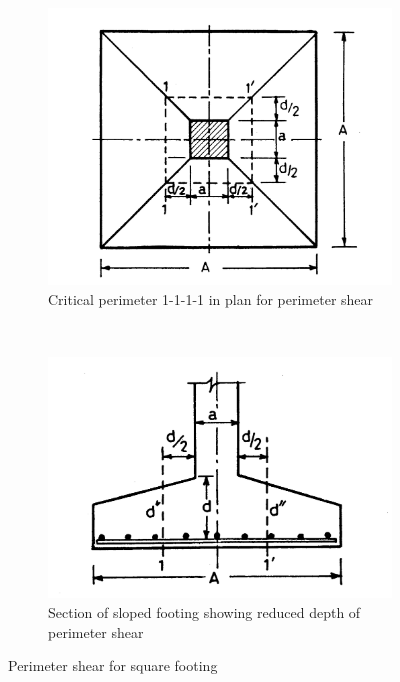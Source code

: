 \begin{figure}
  \centering
  \begin{subfigure}[b]{0.5\textwidth}
    \includegraphics[width=\textwidth]{images/fig2301.png}
    \caption{Critical perimeter 1-1-1-1 in plan for perimeter shear}
    \label{critical perimeter 1-1-1-1}
  \end{subfigure}\\
  \begin{subfigure}[b]{0.5\textwidth}
    \includegraphics[width=\textwidth]{images/fig2302.png}
    \caption{Section of sloped footing showing reduced depth of perimeter shear}
    \label{sectionofslopedfooting }
  \end{subfigure}
\caption{Perimeter shear for square footing}
\label{Perimeter-shear-for-square-footing}
\end{figure}

